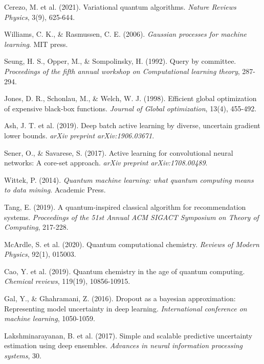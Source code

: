 \documentclass[twocolumn]{article}
\begin{document}
\begin{thebibliography}{20}
Cerezo, M. et al. (2021). Variational quantum algorithms. \textit{Nature Reviews Physics}, 3(9), 625-644.

Williams, C. K., \& Rasmussen, C. E. (2006). \textit{Gaussian processes for machine learning}. MIT press.

Seung, H. S., Opper, M., \& Sompolinsky, H. (1992). Query by committee. \textit{Proceedings of the fifth annual workshop on Computational learning theory}, 287-294.

Jones, D. R., Schonlau, M., \& Welch, W. J. (1998). Efficient global optimization of expensive black-box functions. \textit{Journal of Global optimization}, 13(4), 455-492.

Ash, J. T. et al. (2019). Deep batch active learning by diverse, uncertain gradient lower bounds. \textit{arXiv preprint arXiv:1906.03671}.

Sener, O., \& Savarese, S. (2017). Active learning for convolutional neural networks: A core-set approach. \textit{arXiv preprint arXiv:1708.00489}.

Wittek, P. (2014). \textit{Quantum machine learning: what quantum computing means to data mining}. Academic Press.

Tang, E. (2019). A quantum-inspired classical algorithm for recommendation systems. \textit{Proceedings of the 51st Annual ACM SIGACT Symposium on Theory of Computing}, 217-228.

McArdle, S. et al. (2020). Quantum computational chemistry. \textit{Reviews of Modern Physics}, 92(1), 015003.

Cao, Y. et al. (2019). Quantum chemistry in the age of quantum computing. \textit{Chemical reviews}, 119(19), 10856-10915.

Gal, Y., \& Ghahramani, Z. (2016). Dropout as a bayesian approximation: Representing model uncertainty in deep learning. \textit{International conference on machine learning}, 1050-1059.

Lakshminarayanan, B. et al. (2017). Simple and scalable predictive uncertainty estimation using deep ensembles. \textit{Advances in neural information processing systems}, 30.

\end{thebibliography}
\end{document}
